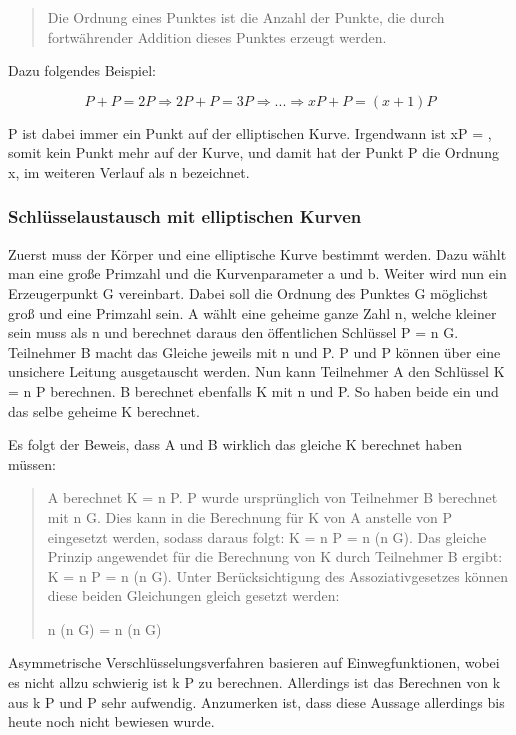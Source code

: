 			\begin{quote}
				\begin{defi}
					Die Ordnung eines Punktes ist die Anzahl der Punkte, die durch fortwährender Addition dieses Punktes erzeugt werden.\cite{Information:und:Kommunikation}
				\end{defi}
			\end{quote}
			
			Dazu folgendes Beispiel:
			
			\begin{displaymath}
			P + P = 2P \Rightarrow 2P +P = 3P \Rightarrow ... \Rightarrow xP + P = (x+1)P
			\end{displaymath}
			
			P ist dabei immer ein Punkt auf der elliptischen Kurve. Irgendwann ist xP = \myInfty, somit kein Punkt mehr auf der Kurve, und damit hat der Punkt P die Ordnung x, im weiteren Verlauf als n bezeichnet.
			
		\subsubsection{Schlüsselaustausch mit elliptischen Kurven}
			Zuerst muss der Körper und eine elliptische Kurve bestimmt werden. Dazu wählt man eine große Primzahl und die Kurvenparameter a und b. Weiter wird nun ein Erzeugerpunkt G vereinbart. Dabei soll die Ordnung des Punktes G möglichst groß und eine Primzahl sein. A wählt eine geheime ganze Zahl n, welche kleiner sein muss als n und berechnet daraus den öffentlichen Schlüssel P = n \mycdot G. Teilnehmer B macht das Gleiche jeweils mit n und P. P und P können über eine unsichere Leitung ausgetauscht werden. Nun kann Teilnehmer A den Schlüssel K = n \mycdot P berechnen. B berechnet ebenfalls K mit n und P. So haben beide ein und das selbe geheime K berechnet.
			
			Es folgt der Beweis, dass A und B wirklich das gleiche K berechnet haben müssen:
			\begin{quote}
				\begin{beweis}
					A berechnet K = n \mycdot P\myTiefstellen{B}. P wurde ursprünglich von Teilnehmer B berechnet mit n \mycdot G. Dies kann in die Berechnung für K von A anstelle von P eingesetzt werden, sodass daraus folgt: K = n \mycdot P = n \mycdot (n \mycdot G). Das gleiche Prinzip angewendet für die Berechnung von K durch Teilnehmer B ergibt: K = n \mycdot P = n \mycdot (n \mycdot G). Unter Berücksichtigung des Assoziativgesetzes können diese beiden Gleichungen gleich gesetzt werden:
					
					\centering n \mycdot (n \mycdot G) = n \mycdot (n\myTiefstellen{A} \mycdot G)
				\end{beweis}
			\end{quote}
			
			Asymmetrische Verschlüsselungsverfahren basieren auf Einwegfunktionen, wobei es nicht allzu schwierig ist k \mycdot P zu berechnen. Allerdings ist das Berechnen von k aus k \mycdot P und P sehr aufwendig. Anzumerken ist, dass diese Aussage allerdings bis heute noch nicht bewiesen wurde.
